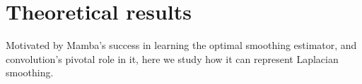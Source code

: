 
\section{Theoretical results}
\label{sec:theory}
Motivated by Mamba's success in learning the optimal smoothing estimator, and convolution's pivotal role in it, here we study how it can represent Laplacian smoothing. 


